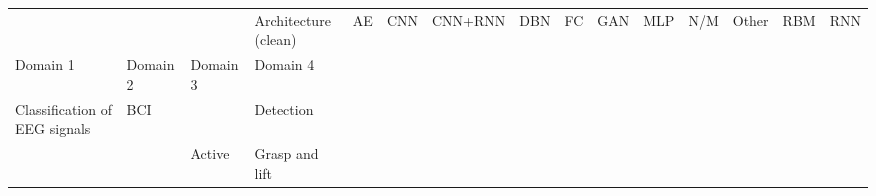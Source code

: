 \begin{tabular}{p{1.5cm}p{1.5cm}p{1.5cm}p{1.5cm}p{0.6cm}p{0.6cm}p{0.6cm}p{0.6cm}p{0.6cm}p{0.6cm}p{0.6cm}p{0.6cm}p{0.6cm}p{0.6cm}p{0.6cm}}
\toprule
                                &                 &                   & Architecture (clean) &                                                          AE &                                                                                                                         CNN &                                                                CNN+RNN &                                  DBN &                                                         FC &                  GAN &                     MLP &                           N/M &               Other &                     RBM &                                                                  RNN \\
Domain 1 & Domain 2 & Domain 3 & Domain 4 &                                                             &                                                                                                                             &                                                                        &                                      &                                                            &                      &                         &                               &                     &                         &                                                                      \\
\midrule
Classification of EEG signals & BCI &   & Detection &                                                             &                                                                                                                             &                                                                        &                                      &                                                            &                      &  \cite{drouin2016using} &                               &                     &                         &                                                                      \\
                                &                 & Active & Grasp and lift &                                                             &                                                                                                                             &                                                                        &                                      &                                                            &                      &                         &                               &                     &                         &                                                        \cite{An2016} \\

\end{tabular}
